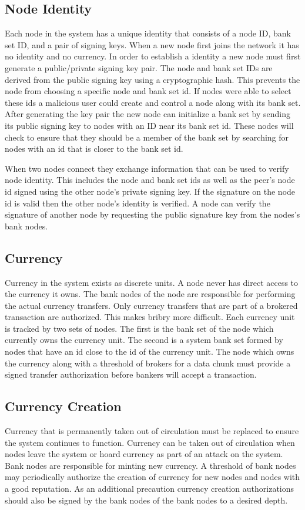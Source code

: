 \documentclass[%
				10pt,
        final,
        notitlepage,
        narroweqnarray,
        inline,
        twoside,
        ]{ieee}
\begin{document}
\subsection{Node Identity}
Each node in the system has a unique identity that consists of a node ID, bank set ID, and a pair of signing keys.  When a new node first joins the network it has no identity and no currency. In order to establish a identity a new node must first generate a public/private signing key pair.  The node and bank set IDs are derived from the public signing key using a cryptographic hash.  This prevents the node from choosing a specific node and bank set id.  If nodes were able to select these ids a malicious user could create and control a node along with its bank set.  After generating the key pair the new node can initialize a bank set by sending its public signing key to nodes with an ID near its bank set id.  These nodes will check to ensure that they should be a member of the bank set by searching for nodes with an id that is closer to the bank set id.  

When two nodes connect they exchange information that can be used to verify node identity.  This includes the node and bank set ids as well as the peer's node id signed using the other node's private signing key.  If the signature on the node id is valid then the other node's identity is verified.  A node can verify the signature of another node by requesting the public signature key from the nodes's bank nodes.

\subsection{Currency}
Currency in the system exists as discrete units.  A node never has direct access to the currency it owns.  The bank nodes of the node are responsible for performing the actual currency transfers.  Only currency transfers that are part of a brokered transaction are authorized. This makes bribry more difficult. Each currency unit is tracked by two sets of nodes.  The first is the bank set of the node which currently owns the currency unit. The second is a system bank set formed by nodes that have an id close to the id of the currency unit. The node which owns the currency along with a threshold of brokers for a data chunk must provide a signed transfer authorization before bankers will accept a transaction.

\subsection{Currency Creation}
Currency that is permanently taken out of circulation must be replaced to ensure the system continues to function.  Currency can be taken out of circulation when nodes leave the system or hoard currency as part of an attack on the system.  Bank nodes are responsible for minting new currency.  A threshold of bank nodes may periodically authorize the creation of currency for new nodes and nodes with a good reputation. As an additional precaution currency creation authorizations should also be signed by the bank nodes of the bank nodes to a desired depth.
\end{document}
